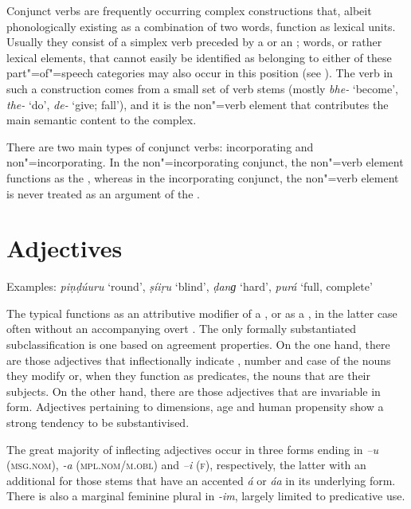 Conjunct verbs are frequently occurring complex  constructions that, albeit phonologically existing as a combination of two words, function as lexical units. Usually they consist of a simplex verb preceded by a  or an ; words, or rather lexical elements, that cannot easily be identified as belonging to either of these part"=of"=speech categories may also occur in this position (see ). The verb in such a construction comes from a small set of verb stems (mostly \textit{bhe-} `become', \textit{the-} `do', \textit{de-} `give; fall'), and it is the non"=verb element that contributes the main semantic content to the complex.


There are two main types of conjunct verbs: incorporating and non"=incorporating. In the non"=incorporating conjunct, the non"=verb element functions as the , whereas in the incorporating conjunct, the non"=verb element is never treated as an argument of the .

\largerpage[-1]
\section{Adjectives}
\label{sec:3b-4}
Examples: \textit{piṇḍúuru} `round', \textit{ṣíiṛu} `blind', \textit{ḍanɡ} `hard', \textit{purá} `full, complete'


The typical  functions as an attributive modifier of a , or as a , in the latter case often without an accompanying overt . The only formally substantiated subclassification is one based on agreement properties. On the one hand, there are those adjectives that inflectionally indicate , number and case of the nouns they modify or, when they function as predicates, the nouns that are their subjects. On the other hand, there are those adjectives that are invariable in form. Adjectives pertaining to dimensions, age and human propensity show a strong tendency to be substantivised.


The great majority of inflecting adjectives occur in three forms ending in \textit{–u} (\textsc{msg.nom}),  \textit{-a} (\textsc{mpl.nom/m.obl}) and \textit{–i} (\textsc{f}), respectively, the latter with an additional  for those stems that have an accented \textit{á} or \textit{áa} in its underlying form. There is also a marginal feminine plural in \textit{-im}, largely limited to predicative use.  


